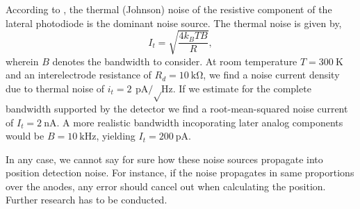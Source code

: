 
According to \cite{Woltring75}, the thermal (Johnson) noise of the resistive component of the lateral photodiode is the dominant noise source.
The thermal noise is given by,
\begin{equation}
	I_t=\sqrt{\frac{4k_BTB}{R}},
\end{equation}
wherein $B$ denotes the bandwidth to consider.
At room temperature $T=\SI{300}{\kelvin}$ and an interelectrode resistance of $R_d=\SI{10}{\kilo\ohm}$, we find a noise current density due to thermal noise of $i_t=\SI{2}{\pico\ampere\per\sqrt\hertz}$.
If we estimate for the complete bandwidth supported by the detector we find a root-mean-squared noise current of $I_t=\SI{2}{\nano\ampere}$.
A more realistic bandwidth incoporating later analog components would be $B=\SI{10}{\kilo\hertz}$, yielding $I_t=\SI{200}{\pico\ampere}$.

In any case, we cannot say for sure how these noise sources propagate into position detection noise.
For instance, if the noise propagates in same proportions over the anodes, any error should cancel out when calculating the position.
Further research has to be conducted.